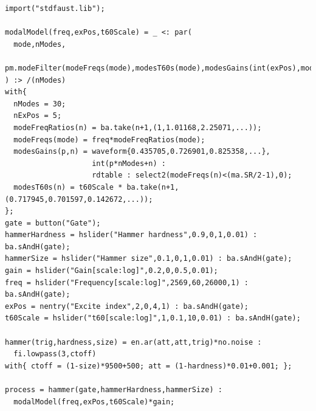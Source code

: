 \documentclass[12pt]{article}
\begin{document}
\begin{small}
\begin{verbatim}
import("stdfaust.lib");

modalModel(freq,exPos,t60Scale) = _ <: par(
  mode,nModes,
  pm.modeFilter(modeFreqs(mode),modesT60s(mode),modesGains(int(exPos),mode))
) :> /(nModes)
with{
  nModes = 30;
  nExPos = 5;
  modeFreqRatios(n) = ba.take(n+1,(1,1.01168,2.25071,...));
  modeFreqs(mode) = freq*modeFreqRatios(mode);
  modesGains(p,n) = waveform{0.435705,0.726901,0.825358,...},
                    int(p*nModes+n) :
                    rdtable : select2(modeFreqs(n)<(ma.SR/2-1),0);
  modesT60s(n) = t60Scale * ba.take(n+1,(0.717945,0.701597,0.142672,...));
};
gate = button("Gate");
hammerHardness = hslider("Hammer hardness",0.9,0,1,0.01) : ba.sAndH(gate);
hammerSize = hslider("Hammer size",0.1,0,1,0.01) : ba.sAndH(gate);
gain = hslider("Gain[scale:log]",0.2,0,0.5,0.01);
freq = hslider("Frequency[scale:log]",2569,60,26000,1) : ba.sAndH(gate);
exPos = nentry("Excite index",2,0,4,1) : ba.sAndH(gate);
t60Scale = hslider("t60[scale:log]",1,0.1,10,0.01) : ba.sAndH(gate);
 
hammer(trig,hardness,size) = en.ar(att,att,trig)*no.noise :
  fi.lowpass(3,ctoff)
with{ ctoff = (1-size)*9500+500; att = (1-hardness)*0.01+0.001; };
 
process = hammer(gate,hammerHardness,hammerSize) :
  modalModel(freq,exPos,t60Scale)*gain;
\end{verbatim}
\end{small}
\end{document}
